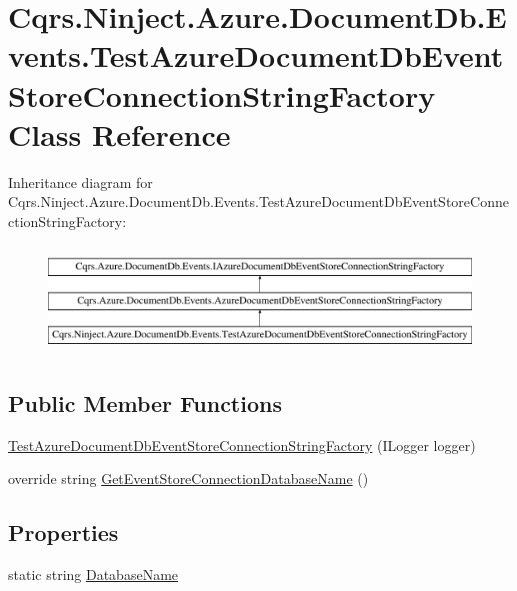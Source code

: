 \hypertarget{classCqrs_1_1Ninject_1_1Azure_1_1DocumentDb_1_1Events_1_1TestAzureDocumentDbEventStoreConnectionStringFactory}{}\section{Cqrs.\+Ninject.\+Azure.\+Document\+Db.\+Events.\+Test\+Azure\+Document\+Db\+Event\+Store\+Connection\+String\+Factory Class Reference}
\label{classCqrs_1_1Ninject_1_1Azure_1_1DocumentDb_1_1Events_1_1TestAzureDocumentDbEventStoreConnectionStringFactory}
Inheritance diagram for Cqrs.\+Ninject.\+Azure.\+Document\+Db.\+Events.\+Test\+Azure\+Document\+Db\+Event\+Store\+Connection\+String\+Factory\+:\begin{figure}[H]
\begin{center}
\leavevmode
\includegraphics[height=2.891566cm]{classCqrs_1_1Ninject_1_1Azure_1_1DocumentDb_1_1Events_1_1TestAzureDocumentDbEventStoreConnectionStringFactory}
\end{center}
\end{figure}
\subsection*{Public Member Functions}
\begin{DoxyCompactItemize}
\item 
\hyperlink{classCqrs_1_1Ninject_1_1Azure_1_1DocumentDb_1_1Events_1_1TestAzureDocumentDbEventStoreConnectionStringFactory_ab9c02577f0f7b3b43d5d4d53a9755894}{Test\+Azure\+Document\+Db\+Event\+Store\+Connection\+String\+Factory} (I\+Logger logger)
\item 
override string \hyperlink{classCqrs_1_1Ninject_1_1Azure_1_1DocumentDb_1_1Events_1_1TestAzureDocumentDbEventStoreConnectionStringFactory_a85b4e6cd45d285be6de5db19148118b9}{Get\+Event\+Store\+Connection\+Database\+Name} ()
\end{DoxyCompactItemize}
\subsection*{Properties}
\begin{DoxyCompactItemize}
\item 
static string \hyperlink{classCqrs_1_1Ninject_1_1Azure_1_1DocumentDb_1_1Events_1_1TestAzureDocumentDbEventStoreConnectionStringFactory_ad82e2485313ff7802ad125958173f3bf}{Database\+Name}
\end{DoxyCompactItemize}
